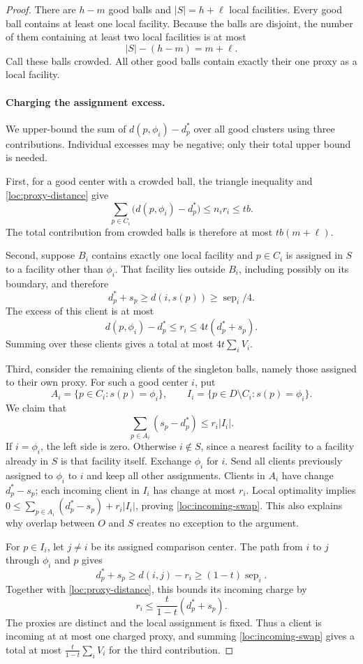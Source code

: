 \begin{proof}
There are $h-m$ good balls and $|S|=h+\ell$ local facilities.  Every good
ball contains at least one local facility.  Because the balls are
disjoint, the number of them containing at least two local facilities
is at most
\[
 |S|-(h-m)=m+\ell.
\]
Call these balls crowded.  All other good balls contain exactly their
one proxy as a local facility.

\paragraph{Charging the assignment excess.}
We upper-bound the sum of $d(p,\phi_i)-d_p^*$ over all good clusters
using three contributions.  Individual excesses may be negative;
only their total upper bound is needed.

First, for a good center with a crowded ball, the triangle inequality
and \eqref{loc:proxy-distance} give
\[
 \sum_{p\in C_i}\bigl(d(p,\phi_i)-d_p^*\bigr)
 \le n_ir_i\le tb.
\]
The total contribution from crowded balls is therefore at most
$tb(m+\ell)$.

Second, suppose $B_i$ contains exactly one local facility and
$p\in C_i$ is assigned in $S$ to a facility other than $\phi_i$.
That facility lies outside $B_i$, including possibly on its boundary,
and therefore
\[
 d_p^*+s_p\ge d(i,s(p))\ge\operatorname{sep}_i/4.
\]
The excess of this client is at most
\[
 d(p,\phi_i)-d_p^*\le r_i
 \le4t(d_p^*+s_p).
\]
Summing over these clients gives a total at most $4t\sum_iV_i$.

Third, consider the remaining clients of the singleton balls, namely
those assigned to their own proxy.  For such a good center $i$, put
\[
 A_i=\{p\in C_i:s(p)=\phi_i\},\qquad
 I_i=\{p\in D\setminus C_i:s(p)=\phi_i\}.
\]
We claim that
\begin{equation}
 \sum_{p\in A_i}(s_p-d_p^*)\le r_i|I_i|.
 \label{loc:incoming-swap}
\end{equation}
If $i=\phi_i$, the left side is zero.  Otherwise $i\notin S$, since a
nearest facility to a facility already in $S$ is that facility itself.
Exchange $\phi_i$ for $i$.  Send all clients previously assigned to
$\phi_i$ to $i$ and keep all other assignments.  Clients in $A_i$ have
change $d_p^*-s_p$; each incoming client in $I_i$ has change at most
$r_i$.  Local optimality implies
$0\le\sum_{p\in A_i}(d_p^*-s_p)+r_i|I_i|$, proving
\eqref{loc:incoming-swap}.  This also explains why overlap between
$O$ and $S$ creates no exception to the argument.

For $p\in I_i$, let $j\ne i$ be its assigned comparison center.
The path from $i$ to $j$ through $\phi_i$ and $p$ gives
\[
 d_p^*+s_p\ge d(i,j)-r_i
 \ge(1-t)\operatorname{sep}_i.
\]
Together with \eqref{loc:proxy-distance}, this bounds its incoming
charge by
\[
 r_i\le\frac{t}{1-t}(d_p^*+s_p).
\]
The proxies are distinct and the local assignment is fixed.  Thus a
client is incoming at at most one charged proxy, and summing
\eqref{loc:incoming-swap} gives a total at most
$\frac{t}{1-t}\sum_iV_i$ for the third contribution.


\end{proof}

